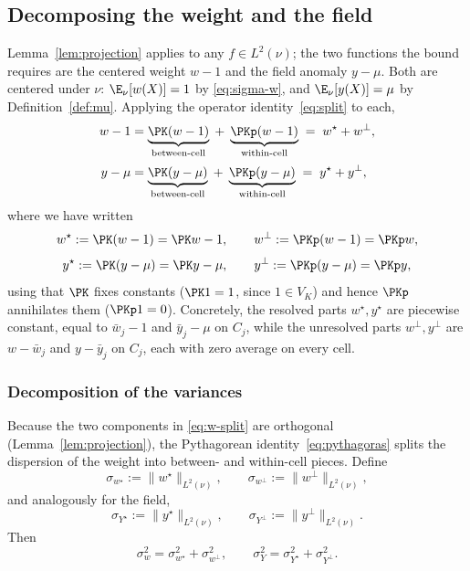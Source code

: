 \subsection{Decomposing the weight and the field}
\label{sec:decomp-wy}

Lemma~\ref{lem:projection} applies to any $f\in L^2(\nu)$; the two
functions the bound requires are the centered weight $w-1$ and the field
anomaly $y-\mu$. Both are centered under $\nu$: $\E_\nu[w(X)]=1$ by
\eqref{eq:sigma-w}, and $\E_\nu[y(X)]=\mu$ by Definition~\ref{def:mu}.
Applying the operator identity~\eqref{eq:split} to each,
\begin{align}
  w-1 &= \underbrace{\PK(w-1)}_{\text{between-cell}}
        \;+\;\underbrace{\PKp(w-1)}_{\text{within-cell}}
        \;=\;w^{\star}+w^{\perp},
  \label{eq:w-split}\\[2pt]
  y-\mu &= \underbrace{\PK(y-\mu)}_{\text{between-cell}}
        \;+\;\underbrace{\PKp(y-\mu)}_{\text{within-cell}}
        \;=\;y^{\star}+y^{\perp},
  \label{eq:y-split}
\end{align}
where we have written
\[
  w^{\star}:=\PK(w-1)=\PK w-1,\qquad w^{\perp}:=\PKp(w-1)=\PKp w,
\]
\[
  y^{\star}:=\PK(y-\mu)=\PK y-\mu,\qquad y^{\perp}:=\PKp(y-\mu)=\PKp y,
\]
using that $\PK$ fixes constants ($\PK 1=1$, since $1\in V_K$) and hence
$\PKp$ annihilates them ($\PKp 1=0$). Concretely, the resolved parts
$w^{\star},y^{\star}$ are piecewise constant, equal to $\bar w_j-1$ and
$\bar y_j-\mu$ on $C_j$, while the unresolved parts $w^{\perp},y^{\perp}$
are $w-\bar w_j$ and $y-\bar y_j$ on $C_j$, each with zero average on
every cell.

\subsubsection*{Decomposition of the variances}

Because the two components in \eqref{eq:w-split} are orthogonal
(Lemma~\ref{lem:projection}), the Pythagorean
identity~\eqref{eq:pythagoras} splits the dispersion of the weight into
between- and within-cell pieces. Define
\begin{equation}
  \sigma_{w^{\star}} := \big\|w^{\star}\big\|_{L^2(\nu)},
  \qquad
  \sigma_{w^{\perp}} := \big\|w^{\perp}\big\|_{L^2(\nu)},
  \label{eq:sigma-w-parts}
\end{equation}
and analogously for the field,
\begin{equation}
  \sigma_{Y^{\star}} := \big\|y^{\star}\big\|_{L^2(\nu)},
  \qquad
  \sigma_{Y^{\perp}} := \big\|y^{\perp}\big\|_{L^2(\nu)} .
  \label{eq:sigma-Y-parts}
\end{equation}
Then
\begin{equation}
  \sigma_w^2=\sigma_{w^{\star}}^2+\sigma_{w^{\perp}}^2,
  \qquad
  \sigma_Y^2=\sigma_{Y^{\star}}^2+\sigma_{Y^{\perp}}^2 .
  \label{eq:var-split}
\end{equation}

